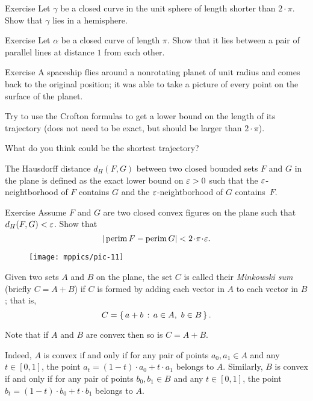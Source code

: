 \begin{thm}{Exercise}\label{ex:2pi-sphere}
Let $\gamma$ be a closed curve in the unit sphere of length shorter than $2\cdot\pi$.
Show that $\gamma$ lies in a hemisphere.
\end{thm}

\begin{thm}{Exercise} 
Let $\alpha$ be a closed curve of length $\pi$.
Show that it lies between a pair of parallel lines at distance $1$ from each other.
\end{thm}

\begin{thm}{Exercise}
A spaceship flies around a nonrotating planet of unit radius and comes back to the original position;
it was able to take a picture of every point on the surface of the planet.

Try to use the Crofton formulas to get a lower bound on the length of its trajectory (does not need to be exact, but should be larger than $2\cdot\pi$).

What do you think could be the shortest trajectory?
\end{thm}

The Hausdorff distance $d_H(F,G)$ between two closed bounded sets $F$ and $G$ in the plane is defined as the exact lower bound on $\varepsilon>0$ such that the $\varepsilon$-neightborhood of $F$ contains $G$ and the $\varepsilon$-neightborhood of $G$ contains~$F$.

\begin{thm}{Exercise}\label{ex:perim-hausdorff}
Assume $F$ and $G$ are two closed convex figures on the plane such that $d_H(F,G)<\varepsilon$.
Show that 
\[|\perim F-\perim G|<2\cdot\pi\cdot\eps.\]

\end{thm}

\begin{wrapfigure}{r}{33 mm}
\vskip-7mm
\centering
\texttt{[image: mppics/pic-11]}
\vskip0mm
\end{wrapfigure}

Given two sets $A$ and $B$ on the plane, the set $C$ is called their \emph{Minkowski sum}  (briefly $C=A+B$) if $C$ is formed by adding each vector in $A$ to each vector in $B$;
that is, 
\[C = \left\{\,{a+b}\,:\,{a\in A,\ b\in B}\,\right\}.\]

Note that if $A$ and $B$ are convex then so is $C=A+B$. %

Indeed, $A$ is convex if and only if for any pair of points $a_0,a_1\in A$ and any $t\in[0,1]$,
the point $a_t=(1-t)\cdot a_0+t\cdot a_1$ belongs to $A$.
Similarly, $B$ is convex if and only if for any pair of points $b_0,b_1\in B$ and any $t\in[0,1]$,
the point $b_t=(1-t)\cdot b_0+t\cdot b_1$ belongs to $A$.

